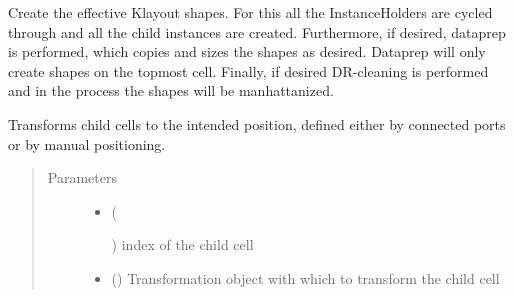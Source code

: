 \documentclass[a4paper,10pt,english]{sphinxmanual}
\begin{document}
\begin{fulllineitems}
\begin{fulllineitems}
\begin{quote}
\begin{description}
\begin{itemize}
\end{itemize}

\end{description}\end{quote}

\end{fulllineitems}


\begin{fulllineitems}
\label{\detokenize{photonics/photonics:kppc.photonics.PhotDevice.produce_impl}}
Create the effective Klayout shapes. For this all the InstanceHolders are cycled through and all the child
instances are created. Furthermore, if desired, dataprep is performed, which copies and sizes the shapes as
desired. Dataprep will only create shapes on the topmost cell. Finally, if desired DR-cleaning is performed and
in the process the shapes will be manhattanized.

\end{fulllineitems}


\begin{fulllineitems}
\label{\detokenize{photonics/photonics:kppc.photonics.PhotDevice.set_transformation}}
Transforms child cells to the intended position, defined either by connected ports or by manual
positioning.
\begin{quote}\begin{description}
\item[{Parameters}] \leavevmode\begin{itemize}
\item {} 
 (%
\begin{footnote}[62]\sphinxAtStartFootnote
{}
%
\end{footnote}) \textendash{} index of the child cell

\item {} 
 () \textendash{} Transformation object with which to transform the child cell


\end{itemize}
\end{description}
\end{quote}
\end{fulllineitems}
\end{fulllineitems}
\end{document}
